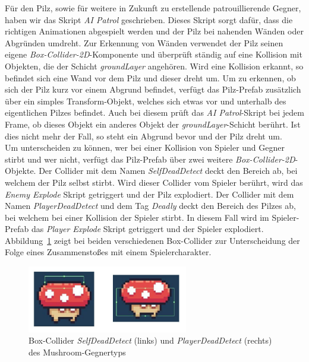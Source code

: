 Für den Pilz, sowie für weitere in Zukunft zu erstellende patrouillierende Gegner, haben wir das Skript \textit{AI Patrol} geschrieben. Dieses Skript sorgt dafür, dass die richtigen Animationen abgespielt werden und der Pilz bei nahenden Wänden oder Abgründen umdreht. Zur Erkennung von Wänden verwendet der Pilz seinen eigene \textit{Box-Collider-2D}-Komponente und überprüft ständig auf eine Kollision mit Objekten, die der Schicht \textit{groundLayer} angehören. Wird eine Kollision erkannt, so befindet sich eine Wand vor dem Pilz und dieser dreht um. Um zu erkennen, ob sich der Pilz kurz vor einem Abgrund befindet, verfügt das Pilz-Prefab zusätzlich über ein simples Transform-Objekt, welches sich etwas vor und unterhalb des eigentlichen Pilzes befindet. Auch bei diesem prüft das \textit{AI Patrol}-Skript bei jedem Frame, ob dieses Objekt ein anderes Objekt der \textit{groundLayer}-Schicht berührt. Ist dies nicht mehr der Fall, so steht ein Abgrund bevor und der Pilz dreht um.\\

Um unterscheiden zu können, wer bei einer Kollision von Spieler und Gegner stirbt und wer nicht, verfügt das Pilz-Prefab über zwei weitere \textit{Box-Collider-2D}-Objekte. Der Collider mit dem Namen \textit{SelfDeadDetect} deckt den Bereich ab, bei welchem der Pilz selbst stirbt. Wird dieser Collider vom Spieler berührt, wird das \textit{Enemy Explode} Skript getriggert und der Pilz explodiert. Der Collider mit dem Namen \textit{PlayerDeadDetect} und dem Tag \textit{Deadly} deckt den Bereich des Pilzes ab, bei welchem bei einer Kollision der Spieler stirbt. In diesem Fall wird im Spieler-Prefab das \textit{Player Explode} Skript getriggert und der Spieler explodiert.\\

Abbildung~\ref{fig:mushroom-colliders} zeigt bei beiden verschiedenen Box-Collider zur Unterscheidung der Folge eines Zusammenstoßes mit einem Spielercharakter.

\begin{figure}[th]
\centering
\includegraphics[width=70mm]{Figures/mushroom-colliders.jpg}
\decoRule
\caption[Box-Collider des Mushroom-Gegnertyps]{Box-Collider \textit{SelfDeadDetect} (links) und \textit{PlayerDeadDetect} (rechts) des Mushroom-Gegnertyps}
\label{fig:mushroom-colliders}
\end{figure}

